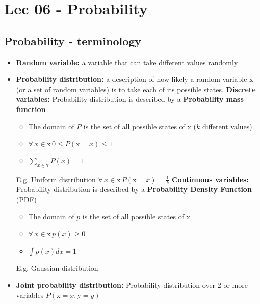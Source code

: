 \chapter{Lec 06 - Probability}

\section{Probability - terminology}
\begin{itemize}
    \item \textbf{Random variable:} a variable that can take different values randomly

    \item \textbf{Probability distribution:} a description of how likely a random variable x (or a set of random variables) is to take each of its possible states.\newline\newline
    \textbf{Discrete variables:} Probability distribution is described by a \textbf{Probability mass function}
    \begin{itemize}
        \item The domain of $P$ is the set of all possible states of x ($k$ different values).
        
        \item $\forall \, x \in \text{x} \, 0 \leq P(\text{x} = x) \leq 1$
        
        \item $\sum_{x \in \text{x}}P(x) = 1$
    \end{itemize}
    E.g. Uniform distribution $\forall \, x \in \text{x} \, P(\text{x} = x) = \frac{1}{k}$\newline\newline
    \textbf{Continuous variables:} Probability distribution is described by a \textbf{Probability Density Function} (PDF) 
    \begin{itemize}
        \item The domain of $p$ is the set of all possible states of x

        \item $\forall \, x \in \text{x}\, p(x) \geq 0$

        \item $\int p(x) dx = 1$
    \end{itemize}
    E.g. Gaussian distribution

    \item \textbf{Joint probability distribution:} Probability distribution over 2 or more variables $P(\text{x} = x, \text{y} = y)$


\end{itemize}
